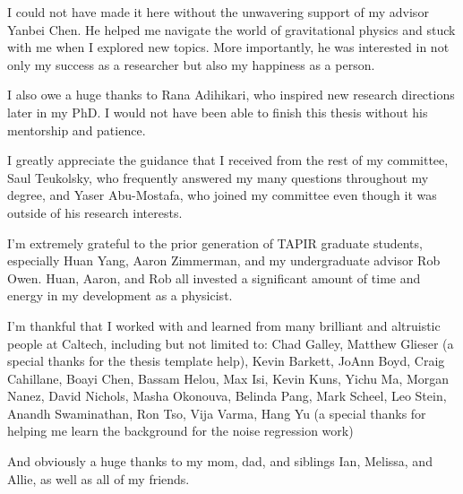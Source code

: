 I could not have made it here without the unwavering support of my advisor Yanbei Chen. He helped me navigate the world of gravitational physics and stuck with me when I explored new topics. More importantly, he was interested in not only my success as a researcher but also my happiness as a person.

I also owe a huge thanks to Rana Adihikari, who inspired new research directions later in my PhD. I would not have been able to finish this thesis without his mentorship and patience. 

I greatly appreciate the guidance that I received from the rest of my committee, Saul Teukolsky, who frequently answered my many questions throughout my degree, and Yaser Abu-Mostafa, who joined my committee even though it was outside of his research interests.

I'm extremely grateful to the prior generation of TAPIR graduate students, especially Huan Yang, Aaron Zimmerman, and my undergraduate advisor Rob Owen. Huan, Aaron, and Rob all invested a significant amount of time and energy in my development as a physicist. 

I'm thankful that I worked with and learned from many brilliant and altruistic people at Caltech, including but not limited to: Chad Galley, Matthew Glieser (a special thanks for the thesis template help), Kevin Barkett, JoAnn Boyd, Craig Cahillane, Boayi Chen, Bassam Helou, Max Isi, Kevin Kuns, Yichu Ma, Morgan Nanez, David Nichols, Masha Okonouva, Belinda Pang, Mark Scheel, Leo Stein, Anandh Swaminathan, Ron Tso, Vija Varma, Hang Yu (a special thanks for helping me learn the background for the noise regression work)

And obviously a huge thanks to my mom, dad, and siblings Ian, Melissa, and Allie, as well as all of my friends.


